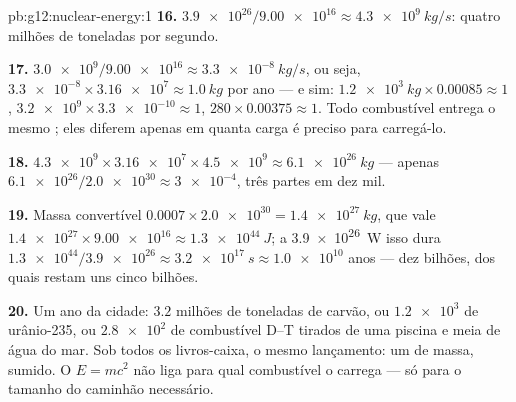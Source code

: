 \begin{solution}{pb:g12:nuclear-energy:1}
\textbf{16.} $\num{3.9e26}/\num{9.00e16} \approx \qty{4.3e9}{kg/s}$:
quatro milhões de toneladas por segundo.

\textbf{17.} $\num{3.0e9}/\num{9.00e16} \approx \qty{3.3e-8}{kg/s}$, ou
seja, $\num{3.3e-8} \times \num{3.16e7} \approx \qty{1.0}{kg}$ por ano
--- e sim: $\qty{1.2e3}{kg} \times 0.00085 \approx 1$,
$\num{3.2e9} \times \num{3.3e-10} \approx 1$,
$280 \times 0.00375 \approx 1$. Todo combustível entrega o mesmo
; eles diferem apenas em quanta carga é preciso para
carregá-lo.

\textbf{18.} $\num{4.3e9} \times \num{3.16e7} \times \num{4.5e9} \approx
\qty{6.1e26}{kg}$ --- apenas
$\num{6.1e26}/\num{2.0e30} \approx \num{3e-4}$, três partes em dez mil.

\textbf{19.} Massa convertível $0.0007 \times \num{2.0e30} =
\qty{1.4e27}{kg}$, que vale
$\num{1.4e27} \times \num{9.00e16} \approx \qty{1.3e44}{J}$; a
\qty{3.9e26}{W} isso dura
$\num{1.3e44}/\num{3.9e26} \approx \qty{3.2e17}{s} \approx \num{1.0e10}$
anos --- dez bilhões, dos quais restam uns cinco bilhões.

\textbf{20.} Um ano da cidade: $3.2$ milhões de toneladas de carvão, ou
$\num{1.2e3}$  de urânio-235, ou $\num{2.8e2}$  de
combustível D--T tirados de uma piscina e meia de água do mar. Sob todos
os livros-caixa, o mesmo lançamento: um  de massa, sumido. O
$E = mc^2$ não liga para qual combustível o carrega --- só para o tamanho
do caminhão necessário.
\end{solution}
